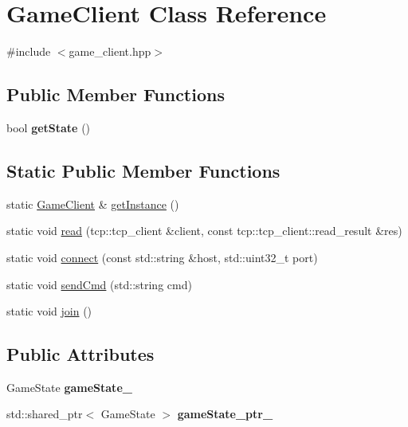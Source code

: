 \hypertarget{classGameClient}{}\section{Game\+Client Class Reference}
\label{classGameClient}


{\ttfamily \#include $<$game\+\_\+client.\+hpp$>$}

\subsection*{Public Member Functions}
\begin{DoxyCompactItemize}
\item 
bool {\bfseries get\+State} ()\hypertarget{classGameClient_af772004c86159c3ed0fee47b2527dcac}{}\label{classGameClient_af772004c86159c3ed0fee47b2527dcac}

\end{DoxyCompactItemize}
\subsection*{Static Public Member Functions}
\begin{DoxyCompactItemize}
\item 
static \hyperlink{classGameClient}{Game\+Client} \& \hyperlink{classGameClient_adfcb979db6333b335dee4e6d785aabcf}{get\+Instance} ()
\item 
static void \hyperlink{classGameClient_a73c9685b821c1480f48e23e63823ad1d}{read} (tcp\+::tcp\+\_\+client \&client, const tcp\+::tcp\+\_\+client\+::read\+\_\+result \&res)
\item 
static void \hyperlink{classGameClient_a2f8c1f7f62a01fd9a6624236285b02d6}{connect} (const std\+::string \&host, std\+::uint32\+\_\+t port)
\item 
static void \hyperlink{classGameClient_a52e2b91ca95b287a30e3c47b82a97547}{send\+Cmd} (std\+::string cmd)
\item 
static void \hyperlink{classGameClient_ad3eda37920dab8f5fcded42f3e08ce25}{join} ()
\end{DoxyCompactItemize}
\subsection*{Public Attributes}
\begin{DoxyCompactItemize}
\item 
Game\+State {\bfseries game\+State\+\_\+}\hypertarget{classGameClient_aff43d375d51a0b462aa740dd10cfd084}{}\label{classGameClient_aff43d375d51a0b462aa740dd10cfd084}

\item 
std\+::shared\+\_\+ptr$<$ Game\+State $>$ {\bfseries game\+State\+\_\+ptr\+\_\+}\hypertarget{classGameClient_af435d6a15915f7ec8947f611dd9c3509}{}\label{classGameClient_af435d6a15915f7ec8947f611dd9c3509}

\end{DoxyCompactItemize}
